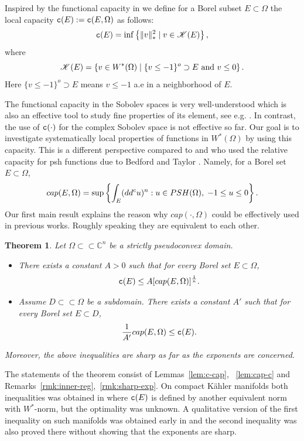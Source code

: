 \documentclass{amsart}
\newcommand{\tc}{{\tt c}}
\newcommand{\Ga}{\Gamma}
\newcommand{\Om}{\Omega}
\newcommand{\bC}{\mathbb{C}}
\newcommand{\cali}[1]{\mathscr{#1}}
\newcommand{\Kc}{\cali{K}}
\newtheorem{thm}{Theorem}
\theoremstyle{definition}
\numberwithin{thm}{section}
\numberwithin{equation}{section}
\renewcommand{\[}{\begin{equation}}
\renewcommand{\]}{\end{equation}}
\newcommand{\rv}{\;\rvert\;}
\begin{document}
Inspired by the functional capacity in \cite{Vigny} we define for a Borel subset $E\subset \Om$ the local capacity $\tc(E):= \tc(E,\Om)$  as follows:
\[\label{eq:intro-cap-defn}\notag
	{\tt c}(E) = \inf 
	\left\{ \| v \|_*^2 \;\rvert\;  v\in \Kc(E)
	\right\},
\] 
where
\[\label{eq:intro-ke-cap}\notag
 	\Kc(E) = \left\{ v \in W^*(\Om) \rv \{v \leq  -1\}^o \supset E \text{ and } v\leq 0 \right\}.
\]
Here $ \{v \leq  -1\}^o \supset E$ means $v\leq -1$ a.e in a neighborhood of $E$. 

The functional capacity in the Sobolev spaces is very well-understood which is also an effective tool to study fine properties of its element, see e.g. \cite[Chapters~4.7-4.8]{EG92}. In contrast, the use of $\tc(\cdot)$ for the complex Sobolev space is not effective so far. 
Our goal is to investigate systematically local properties of functions in $W^*(\Om)$ by using this capacity. This is a different perspective compared to \cite{Vigny} and \cite{DMV} who used the relative capacity for psh functions due to Bedford and Taylor \cite{BT82}. Namely, for a Borel set $E\subset \Om$, 
\[\label{eq:intro-BT-cap}\notag
 cap(E,\Om) = \sup\left\{ \int_E (dd^c u)^n :  u\in PSH(\Om), \;-1 \leq u \leq 0\right\}.
\]
Our first main result explains the reason why $cap(\cdot, \Om)$ could be effectively used in previous works. Roughly speaking they are equivalent to each other. 

\begin{thm} \label{thm:intro-cap-comp} 
Let $\Om \subset \subset \bC^n$ be a strictly pseudoconvex domain. 
\begin{itemize}
\item[(a)] There exists a constant $A>0$ such that for every Borel set $E\subset \Om$,
$$
	\tc(E) \leq A [cap(E,\Om)]^\frac{1}{n}.
$$
\item[(b)]
Assume $D \subset \subset \Om$ be a subdomain. There exists a constant $A'$ such that for every Borel set $E\subset D$,
$$
	\frac{1}{A'} cap(E,\Om) \leq \tc (E).
$$
\end{itemize}
Moreover, the above inequalities are sharp as far as the exponents are concerned.
\end{thm}
The statements of the theorem consist of Lemmas~\ref{lem:c-cap}, ~\ref{lem:cap-c} and Remarks~\ref{rmk:inner-reg},~\ref{rmk:sharp-exp}. 
On compact K\"ahler manifolds both inequalities  was obtained in \cite[Proposition~5.1]{DKN} where $\tc(E)$ is defined by another equivalent norm with $W^*$-norm, but the optimality was unknown. %
 A qualitative version  of the first inequality on such manifolds was obtained early in \cite{Vigny} and the second inequality was also proved there without showing that the exponents are sharp.
\end{document}

